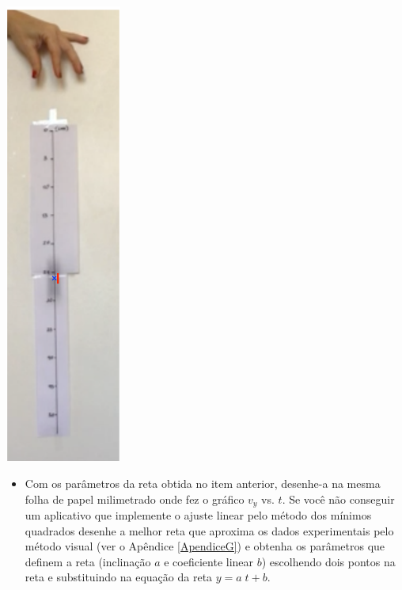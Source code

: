 \begin{minipage}[c]{6cm}
\hskip 1cm
\includegraphics[width=3.8cm]{Figuras_exp3/fig2roteiro.pdf}
\label{fig2roteiro}
\end{minipage}
\begin{itemize}
\item Com os parâmetros da reta obtida no item anterior,  desenhe-a  na mesma folha de papel milimetrado 
onde fez o gráfico $v_y$ vs. $t$. Se você não conseguir um aplicativo que implemente o ajuste linear pelo método dos mínimos quadrados desenhe a melhor reta que aproxima os dados experimentais 
pelo método visual (ver o Apêndice \ref{ApendiceG}) e obtenha os parâmetros que definem a reta 
(inclinação $a$ e coeficiente linear $b$) escolhendo dois pontos na reta e substituindo na equação da reta $y=a\;t+b$.
\end{itemize}
  
